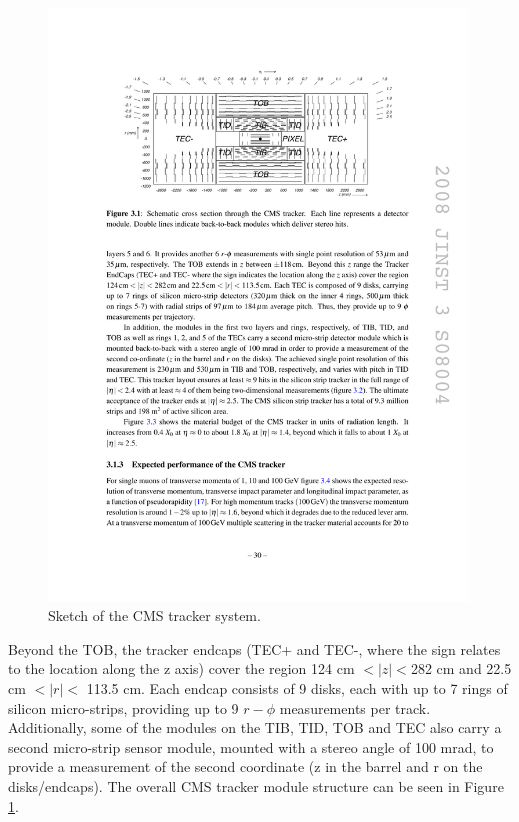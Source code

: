 \begin{figure}[h]
\centering 
\includegraphics[width=0.99\textwidth]{figures/cms_tracker}\hfil
\caption{Sketch of the CMS tracker system. }
\label{fig:cms_tracker}
\end{figure}


Beyond the TOB, the tracker endcaps (TEC+ and TEC-, where the sign relates to the location along the z axis) cover the region 124 cm $< |z| < $282 cm and 22.5 cm $< |r| <$ 113.5 cm. 
Each endcap consists of 9 disks, each with up to 7 rings of silicon micro-strips, providing up to 9 $r-\phi$ measurements per track. 
Additionally, some of the modules on the TIB, TID, TOB and TEC also carry a second micro-strip sensor module, mounted with a stereo angle of 100 mrad, to provide a measurement of the second coordinate (z in the barrel and r on the disks/endcaps). 
The overall CMS tracker module structure can be seen in Figure \ref{fig:cms_tracker}.


